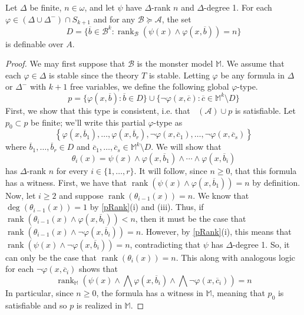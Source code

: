 \documentclass{article}
\newcommand\monster{\mathbb{M}}
\DeclareMathOperator{\Diagel}{Diag_{el}}
\DeclareMathOperator{\rank}{rank}
\let\mc\mathcal
\begin{document}
\begin{lemma}
    Let $\Delta$ be finite, $n \in \omega$, and let $\psi$ have $\Delta$-rank $n$ and $\Delta$-degree 1. For each $\varphi \in (\Delta \cup \Delta^{-}) \cap S_{k+1}$ and for any $\mc{B} \succeq \mc{A}$, the set
    \[ D = \{ \overline{b} \in \mc{B}^{k} : \rank_{\mc{B}}(\psi(x) \land \varphi(x, \overline{b})) = n \} \]
    is definable over $A$.
\end{lemma}
\begin{proof}
    We may first suppose that $\mc{B}$ is the monster model $\monster$. We assume that each $\varphi \in \Delta$ is stable since the theory $T$ is stable. Letting $\varphi$ be any formula in $\Delta$ or $\Delta^{-}$ with $k+1$ free variables, we define the following global $\varphi$-type.
    \[ p = \{ \varphi(x, \overline{b}) : \overline{b} \in D \} \cup \{ \neg\varphi(x, \overline{c}) : \overline{c} \in \monster^{k} \setminus D \} \]
    First, we show that this type is consistent, i.e. that $\Diagel(\mc{A}) \cup p$ is satisfiable. Let $p_0 \subset p$ be finite; we'll write this partial $\varphi$-type as
    \[ \left\{ \varphi(x, \overline{b}_1), \ldots, \varphi(x, \overline{b}_r), \neg\varphi(x, \overline{c}_1), \ldots, \neg\varphi(x, \overline{c}_s) \right\} \]
    where $\overline{b}_1, \ldots, \overline{b}_r \in D$ and $\overline{c}_1, \ldots, \overline{c}_s \in \monster^{k} \setminus D$. We will show that
    \[ \theta_{i}(x) = \psi(x) \land \varphi(x, \overline{b}_1) \land \cdots \land \varphi(x, \overline{b}_i) \]
    has $\Delta$-rank $n$ for every $i \in \{ 1, \ldots, r \}$. It will follow, since $n \geq 0$, that this formula has a witness. First, we have that $\rank(\psi(x) \land \varphi(x, \overline{b}_1)) = n$ by definition. Now, let $i \geq 2$ and suppose $\rank(\theta_{i-1}(x)) = n$. We know that $\deg(\theta_{i-1}(x)) = 1$ by \autoref{pRank}(i) and (iii). Thus, if $\rank(\theta_{i-1}(x) \land \varphi(x, \overline{b}_i)) < n$, then it must be the case that $\rank(\theta_{i-1}(x) \land \neg\varphi(x, \overline{b}_i)) = n$. However, by \autoref{pRank}(i), this means that $\rank(\psi(x) \land \neg\varphi(x, \overline{b}_i)) = n$, contradicting that $\psi$ has $\Delta$-degree 1. So, it can only be the case that $\rank(\theta_{i}(x)) = n$. This along with analogous logic for each $\neg\varphi(x, \overline{c}_i)$ shows that
    \[ \rank_{\monster}\left( \psi(x) \land \bigwedge \varphi(x, \overline{b}_i) \land \bigwedge \neg\varphi(x, \overline{c}_i) \right) = n \]
    In particular, since $n \geq 0$, the formula has a witness in $\monster$, meaning that $p_0$ is satisfiable and so $p$ is realized in $\monster$.


\end{proof}
\end{document}
